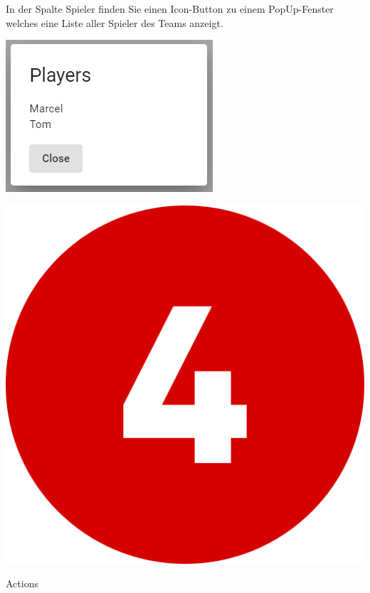 In der Spalte Spieler finden Sie einen Icon-Button zu einem PopUp-Fenster welches eine Liste aller Spieler des Teams anzeigt.

\includegraphics[scale=0.5]{pics/user-guide/teams-player-popup.PNG}

\bigskip
\includegraphics[scale=0.05]{pics/user-guide/numbers/number-4.png} \begin{LARGE} Actions \end{LARGE}

